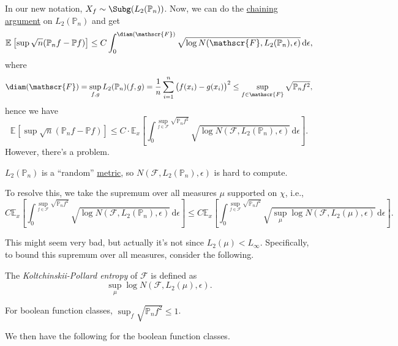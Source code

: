 In our new notation, \(X_f \sim \Subg(L_2(\mathbb{P} _n))\). Now, we can do the \hyperref[note:chaining]{chaining argument} on \(L_2(\mathbb{P} _n)\) and get
\[
	\mathbb{E}_{}\left[\sup \sqrt{n} (\mathbb{P} _n f - \mathbb{P} f) \right]
	\leq C\int_{0}^{\diam(\mathscr{F} ) } \sqrt{\log N(\mathscr{F} , L_2(\mathbb{P} _n), \epsilon )} \,\mathrm{d}\epsilon ,
\]
where
\[
	\diam(\mathscr{F} )
	= \sup _{f, g} L_2(\mathbb{P} _n)(f, g) = \frac{1}{n} \sum_{i=1}^{n} \big(f(x_i) - g(x_i)\big)^2
	\leq \sup _{f\in \mathscr{F} } \sqrt{\mathbb{P} _n f^2},
\]
hence we have
\[
	\mathbb{E}_{}\left[\sup \sqrt{n} (\mathbb{P} _n f - \mathbb{P} f) \right]
	\leq C\cdot \mathbb{E}_{x}\left[ \int_{0}^{\sup \limits_{f\in \mathscr{F} } \sqrt{\mathbb{P} _n f^2} } \sqrt{\log N(\mathscr{F} , L_2(\mathbb{P} _n), \epsilon )} \,\mathrm{d}\epsilon \right].
\]
However, there's a problem.

\begin{problem*}
	\(L_2(\mathbb{P} _n)\) is a ``random'' \hyperref[def:pseudo-metric]{metric}, so \(N(\mathscr{F} , L_2(\mathbb{P} _n), \epsilon )\) is hard to compute.
\end{problem*}
\begin{answer}
	To resolve this, we take the supremum over all measures \(\mu \) supported on \(\chi \), i.e.,
	\[
		C \mathbb{E}_{x}\left[\int_{0}^{\sup\limits_{f\in \mathscr{F} } \sqrt{\mathbb{P} _n f^2} } \sqrt{\log N(\mathscr{F} , L_2(\mathbb{P} _n), \epsilon )} \,\mathrm{d}\epsilon \right]
		\leq C \mathbb{E}_{x}\left[\int_{0}^{\sup\limits_{f\in \mathscr{F} } \sqrt{\mathbb{P} _n f^2} } \sqrt{\sup _\mu \log N(\mathscr{F} , L_2(\mu ), \epsilon )} \,\mathrm{d}\epsilon \right].
	\]
\end{answer}

This might seem very bad, but actually it's not since \(L_2(\mu ) < L_\infty\). Specifically, to bound this supremum over all measures, consider the following.

\begin{definition}\label{def:Koltchinskii-Pollard-entropy}
	The \emph{Koltchinskii-Pollard entropy} of \(\mathscr{F} \) is defined as
	\[
		\sup _{\mu } \log N(\mathscr{F} , L_2(\mu ), \epsilon ).
	\]
\end{definition}

\begin{eg}
	For boolean function classes, \(\sup _f \sqrt{\mathbb{P} _n f^2} \leq 1\).
\end{eg}

We then have the following for the boolean function classes.

